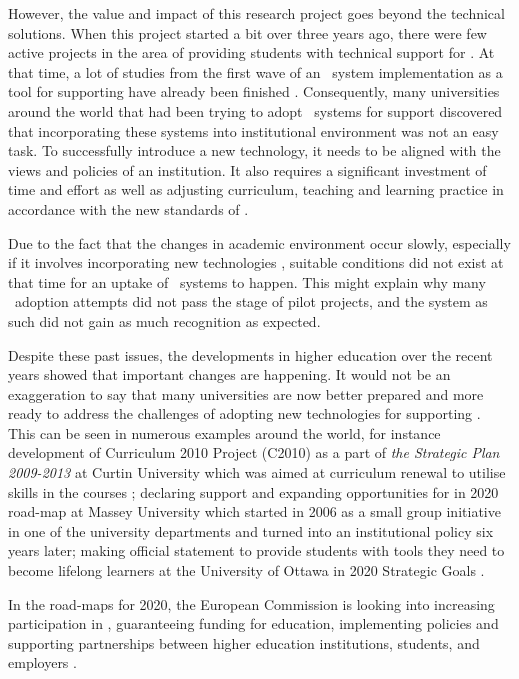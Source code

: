 However, the value and impact of this research project goes beyond the
technical solutions. When this project started a bit over three years ago,
there were few active projects in the area of providing students with technical
support for \LLLsn. At that time, a lot of studies from the first wave of an
\ep~system implementation as a tool for supporting \LLLs have already been
finished \citep{Batson2010}. Consequently, many universities around the world
that had been trying to adopt \ep~systems for \LLLs support discovered that
incorporating these systems into institutional environment was not an easy task.
To successfully introduce a new technology, it needs to be aligned with the
views and policies of an institution. It also requires a significant investment
of time and effort as well as adjusting curriculum, teaching and learning
practice in accordance with the new standards of \LLLsn.

Due to the fact that the changes in academic environment occur slowly,
especially if it involves incorporating new technologies \citep{Molebash1999},
suitable conditions did not exist at that time for an uptake of \ep~systems to
happen. This might explain why many \ep~adoption attempts did not pass the stage
of pilot projects, and the system as such did not gain as much recognition as
expected.

Despite these past issues, the developments in higher education over the recent
years showed that important changes are happening. It would not be an
exaggeration to say that many universities are now better prepared and more
ready to address the challenges of adopting new technologies for supporting
\LLLsn. This can be seen in numerous examples around the world, for instance
development of Curriculum 2010 Project (C2010) as a part of \textit{the
Strategic Plan 2009-2013} at Curtin University which was aimed at curriculum
renewal to utilise \LLLs skills in the courses \citep{Oliver2010}; declaring
support and expanding opportunities for \LLLs in 2020 road-map at Massey
University \citep{MasseyUniversity2012} which started in 2006 as a small group
initiative in one of the university departments and turned into an institutional
policy six years later; making official statement to provide students with tools
they need to become lifelong learners at the University of Ottawa in 2020
Strategic Goals \citep{UniversityofOttawa2011}.

In the road-maps for 2020, the European Commission is looking into increasing
participation in \LLLsn, guaranteeing funding for education, implementing \LLLs
policies and supporting partnerships between higher education institutions,
students, and employers \citep{EuropeanCommission2010,EuropeanUnion2009}.

